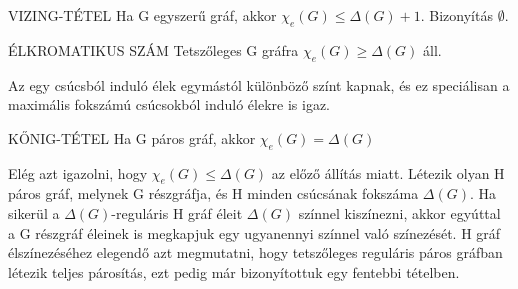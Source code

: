 \begin{tetel}{VIZING-TÉTEL}
Ha G egyszerű gráf, akkor $\chi_e(G) \leq \Delta(G) + 1$. Bizonyítás $\emptyset$.
\end{tetel}

\begin{tetel}{ÉLKROMATIKUS SZÁM}
Tetszőleges G gráfra $\chi_e(G) \geq \Delta(G)$ áll.
\end{tetel}

\begin{bizonyitas}{}
Az egy csúcsból induló élek egymástól különböző színt kapnak, és ez speciálisan a maximális fokszámú csúcsokból induló élekre is igaz.
\end{bizonyitas}

\begin{tetel}{KŐNIG-TÉTEL}
Ha G páros gráf, akkor $\chi_e(G) = \Delta(G)$
\end{tetel}

\begin{bizonyitas}{}
Elég azt igazolni, hogy $\chi_e(G) \leq \Delta(G)$ az előző állítás miatt. Létezik olyan H páros gráf, melynek G részgráfja, és H minden csúcsának fokszáma $\Delta(G)$. Ha sikerül a $\Delta(G)$-reguláris H gráf éleit $\Delta(G)$ színnel kiszínezni, akkor egyúttal a G részgráf éleinek is megkapjuk egy ugyanennyi színnel való színezését. H gráf élszínezéséhez elegendő azt megmutatni, hogy tetszőleges reguláris páros gráfban létezik teljes párosítás, ezt pedig már bizonyítottuk egy fentebbi tételben.
\end{bizonyitas}
